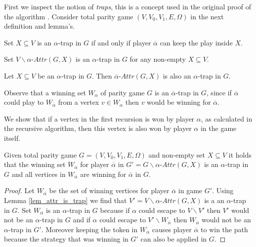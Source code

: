 First we inspect the notion of \textit{traps}, this is a concept used in the original proof of the algorithm \cite{ZIELONKA1998135}. Consider total parity game $(V,V_0,V_1,E,\Omega)$ in the next definition and lemma's.
\begin{definition}\cite{ZIELONKA1998135}
	Set $X \subseteq V$ is an $\alpha$-trap in $G$ if and only if player $\overline{\alpha}$ can keep the play inside $X$.
\end{definition}
\begin{lemma}\label{lem_attr_is_trap}
	\cite{ZIELONKA1998135}
	Set $V\backslash \alpha\textit{-Attr}(G,X)$ is an $\alpha$-trap in $G$ for any non-empty $X \subseteq V$.
\end{lemma}
\begin{lemma}
	\label{lem_attr_trap_is_trap}\cite{ZIELONKA1998135}
	Let $X \subseteq V$ be an $\alpha$-trap in $G$. Then $\overline{\alpha}\textit{-Attr}(G,X)$ is also an $\alpha$-trap in $G$.
\end{lemma}
Observe that a winning set $W_\alpha$ of parity game $G$ is an $\overline{\alpha}$-trap in $G$, since if $\overline{\alpha}$ could play to $W_{\overline{\alpha}}$ from a vertex $v \in W_\alpha$ then $v$ would be winning for $\overline{\alpha}$.


We show that if a vertex in the first recursion is won by player $\alpha$, as calculated in the recursive algorithm, then this vertex is also won by player $\alpha$ in the game itself.
\begin{lemma}
	\label{lem_overlinealphawinner}
	Given total parity game $G = (V,V_0,V_1,E,\Omega)$ and non-empty set $X \subseteq V$ it holds that the winning set $W_{\overline{\alpha}}$ for player $\overline{\alpha}$ in  $G' = G \backslash \alpha\textit{-Attr}(G,X)$ is an $\alpha$-trap in $G$ and all vertices in $W_{\overline{\alpha}}$ are winning for $\overline{\alpha}$ in $G$.
	\begin{proof}
		Let $W_{\overline{\alpha}}$ be the set of winning vertices for player $\overline{\alpha}$ in game $G'$. Using Lemma \ref{lem_attr_is_trap} we find that $V' = V \backslash \alpha\textit{-Attr}(G,X)$ is a an $\alpha$-trap in $G$. Set $W_{\overline{\alpha}}$ is an $\alpha$-trap in $G$ because if $\alpha$ could escape to $V \backslash V'$ then $V'$ would not be an $\alpha$-trap in $G$ and if $\alpha$ could escape to $V' \backslash W_{\overline{\alpha}}$ then $W_{\overline{\alpha}}$ would not be an $\alpha$-trap in $G'$. Moreover keeping the token in $W_{\overline{\alpha}}$ causes player $\overline{\alpha}$ to win the path because the strategy that was winning in $G'$ can also be applied in $G$.
	\end{proof}
\end{lemma}

